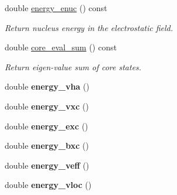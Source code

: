 \begin{DoxyCompactItemize}
\item 
double \hyperlink{classsirius_1_1_d_f_t__ground__state_ad75a3d114cfb050be6651cb7f2ed0098}{energy\+\_\+enuc} () const 
\begin{DoxyCompactList}\small\item\em Return nucleus energy in the electrostatic field. \end{DoxyCompactList}\item 
double \hyperlink{classsirius_1_1_d_f_t__ground__state_aa1839e8c39152220e7b76057bbc00c8d}{core\+\_\+eval\+\_\+sum} () const 
\begin{DoxyCompactList}\small\item\em Return eigen-\/value sum of core states. \end{DoxyCompactList}\item 
\hypertarget{classsirius_1_1_d_f_t__ground__state_a4feb14055b2fdb3e0025416d7cdd9e4b}{}double {\bfseries energy\+\_\+vha} ()\label{classsirius_1_1_d_f_t__ground__state_a4feb14055b2fdb3e0025416d7cdd9e4b}

\item 
\hypertarget{classsirius_1_1_d_f_t__ground__state_ad35522c8a81d40a248f2371d68435b2e}{}double {\bfseries energy\+\_\+vxc} ()\label{classsirius_1_1_d_f_t__ground__state_ad35522c8a81d40a248f2371d68435b2e}

\item 
\hypertarget{classsirius_1_1_d_f_t__ground__state_ae5349cbdf23050716ea7c0f787cdd49c}{}double {\bfseries energy\+\_\+exc} ()\label{classsirius_1_1_d_f_t__ground__state_ae5349cbdf23050716ea7c0f787cdd49c}

\item 
\hypertarget{classsirius_1_1_d_f_t__ground__state_a603d9cafbbb3e5a1045943a9d93f1ddc}{}double {\bfseries energy\+\_\+bxc} ()\label{classsirius_1_1_d_f_t__ground__state_a603d9cafbbb3e5a1045943a9d93f1ddc}

\item 
\hypertarget{classsirius_1_1_d_f_t__ground__state_a4bad605a8dc9cefe7a42a5a236d4ac71}{}double {\bfseries energy\+\_\+veff} ()\label{classsirius_1_1_d_f_t__ground__state_a4bad605a8dc9cefe7a42a5a236d4ac71}

\item 
\hypertarget{classsirius_1_1_d_f_t__ground__state_abc9d07d038cf17cc17c345cb556e09d8}{}double {\bfseries energy\+\_\+vloc} ()\label{classsirius_1_1_d_f_t__ground__state_abc9d07d038cf17cc17c345cb556e09d8}


\end{DoxyCompactItemize}
